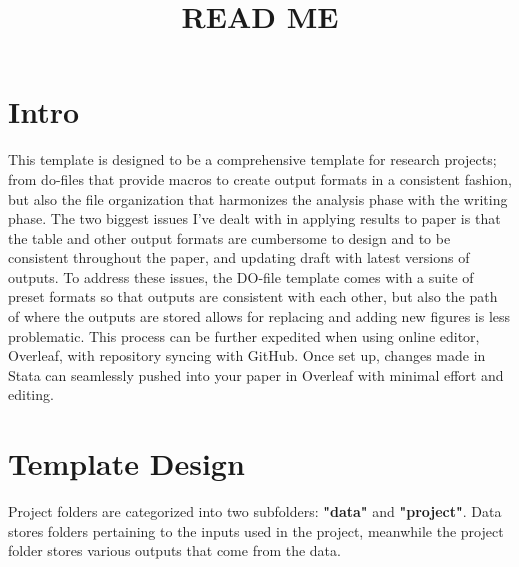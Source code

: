 \documentclass[12pt]{article}
\title{READ ME}
\begin{document}
\maketitle

\section{Intro}
This template is designed to be a comprehensive template for research projects; from do-files that provide macros to create output formats in a consistent fashion, but also the file organization that harmonizes the analysis phase with the writing phase. The two biggest issues I've dealt with in applying results to paper is that the table and other output formats are cumbersome to design and to be consistent throughout the paper, and updating draft with latest versions of outputs. To address these issues, the DO-file template comes with a suite of preset formats so that outputs are consistent with each other, but also the path of where the outputs are stored allows for replacing and adding new figures is less problematic. This process can be further expedited when using online editor, Overleaf, with repository syncing with GitHub. Once set up, changes made in Stata can seamlessly pushed into your paper in Overleaf with minimal effort and editing.

\section{Template Design}
Project folders are categorized into two subfolders: \textbf{"data"} and \textbf{"project"}. Data stores folders pertaining to the inputs used in the project, meanwhile the project folder stores various outputs that come from the data.
\end{document}
